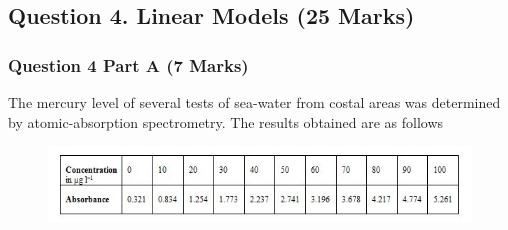 \documentclass[a4paper,12pt]{article}
\begin{document}
\newpage
\subsection*{Question 4. Linear Models (25 Marks)}
\subsubsection*{Question 4 Part A (7 Marks)}
The mercury level of several tests of sea-water from costal areas was determined by atomic-absorption spectrometry. The results obtained are as follows

\begin{figure}[h!]
	\centering
	\includegraphics[width=1.1\linewidth]{image/regressionData}
\end{figure}
\end{document}
